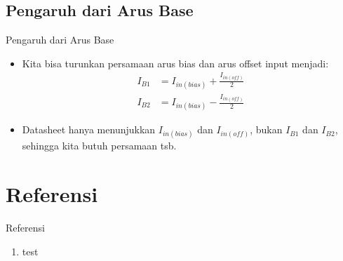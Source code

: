 \documentclass[aspectratio=169]{beamer}
\begin{document}
\subsection{Pengaruh dari Arus Base}
\begin{frame}{Pengaruh dari Arus Base}
	\begin{itemize}
		\item Kita bisa turunkan persamaan arus bias dan arus offset input menjadi:
		\begin{align*}
			I_{B1} &= I_{in(bias)} + \frac{I_{in(off)}}{2} \\
			I_{B2} &= I_{in(bias)} - \frac{I_{in(off)}}{2}
		\end{align*}
		\item Datasheet hanya menunjukkan $ I_{in(bias)} $ dan $ I_{in(off)} $, bukan $ I_{B1} $ dan $ I_{B2} $, sehingga kita butuh persamaan tsb.
	\end{itemize}
\end{frame}

\section{Referensi}
\begin{frame}{Referensi}
	\begin{enumerate}
		\item test
	\end{enumerate}
\end{frame}
\end{document}
